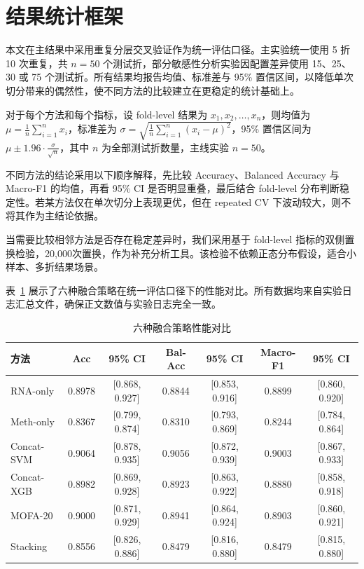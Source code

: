 
\section{结果统计框架}

本文在主结果中采用重复分层交叉验证作为统一评估口径。主实验统一使用 5 折 10 次重复，共 $n=50$ 个测试折，部分敏感性分析实验因配置差异使用 15、25、30 或 75 个测试折。所有结果均报告均值、标准差与 95\% 置信区间，以降低单次切分带来的偶然性，使不同方法的比较建立在更稳定的统计基础上。

对于每个方法和每个指标，设 fold-level 结果为 $x_1, x_2, \dots, x_n$，则均值为 $\mu = \frac{1}{n} \sum_{i=1}^{n} x_i$，标准差为 $\sigma = \sqrt{\frac{1}{n} \sum_{i=1}^{n} (x_i - \mu)^2}$，95\% 置信区间为 $\mu \pm 1.96 \cdot \frac{\sigma}{\sqrt{n}}$，其中 $n$ 为全部测试折数量，主线实验 $n=50$。

不同方法的结论采用以下顺序解释，先比较 Accuracy、Balanced Accuracy 与 Macro-F1 的均值，再看 95\% CI 是否明显重叠，最后结合 fold-level 分布判断稳定性。若某方法仅在单次切分上表现更优，但在 repeated CV 下波动较大，则不将其作为主结论依据。

当需要比较相邻方法是否存在稳定差异时，我们采用基于 fold-level 指标的双侧置换检验，20,000次置换，作为补充分析工具。该检验不依赖正态分布假设，适合小样本、多折结果场景。

表~\ref{tab:results-main} 展示了六种融合策略在统一评估口径下的性能对比。所有数据均来自实验日志汇总文件，确保正文数值与实验日志完全一致。

\begin{table}[H]
\centering
\small
\caption{六种融合策略性能对比}
\label{tab:results-main}
\begin{tabular}{lcccccc}
\toprule
方法 & Acc & 95\% CI & Bal-Acc & 95\% CI & Macro-F1 & 95\% CI \\
\midrule
RNA-only & 0.8978 & [0.868, 0.927] & 0.8844 & [0.853, 0.916] & 0.8899 & [0.860, 0.920] \\
Meth-only & 0.8367 & [0.799, 0.874] & 0.8310 & [0.793, 0.869] & 0.8244 & [0.784, 0.864] \\
Concat-SVM & 0.9064 & [0.878, 0.935] & 0.9056 & [0.872, 0.939] & 0.9003 & [0.867, 0.933] \\
Concat-XGB & 0.8982 & [0.869, 0.928] & 0.8923 & [0.863, 0.922] & 0.8880 & [0.858, 0.918] \\
MOFA-20 & 0.9000 & [0.871, 0.929] & 0.8941 & [0.864, 0.924] & 0.8903 & [0.860, 0.921] \\
Stacking & 0.8556 & [0.826, 0.886] & 0.8479 & [0.816, 0.880] & 0.8479 & [0.815, 0.880] \\
\bottomrule
\end{tabular}
\end{table}

